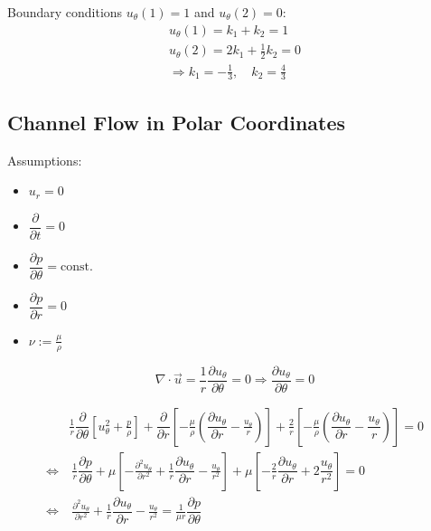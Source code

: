 \documentclass{article}
\numberwithin{equation}{section}
\newcommand{\pd}[2]{\dfrac{\partial #1}{\partial #2}}
\renewcommand{\div}{\nabla \cdot}
\begin{document}
Boundary conditions $u_\theta(1) = 1$ and $u_\theta(2) = 0$:
\begin{gather*}
    u_\theta(1) = k_1 + k_2 = 1 \\
    u_\theta(2) = 2 k_1 + \frac12 k_2 = 0 \\
    \Rightarrow k_1 = -\frac13, \quad k_2 = \frac43
\end{gather*}

\subsection{Channel Flow in Polar Coordinates}

Assumptions:
\begin{itemize}
    \item $u_r = 0$
    \item $\pd{}{t} = 0$
    \item $\pd{p}{\theta} = \text{const.}$
    \item $\pd{p}{r} = 0$
    \item $\nu := \frac{\mu}{\rho}$
\end{itemize}

\begin{equation}
    \div \vec{u} = \frac1r \pd{u_\theta}{\theta} = 0 \Rightarrow \pd{u_\theta}{\theta} = 0
\end{equation}

\begin{equation}
    \begin{aligned}
        &\frac1r \pd{}{\theta} \left[
            u_\theta^2 +
            \frac{p}{\rho}
        \right] +
        \pd{}{r} \left[
            -\frac{\mu}{\rho} \left(
                \pd{u_\theta}{r} - \frac{u_\theta}{r}
            \right)
        \right] +
        \frac2r \left[
            -\frac{\mu}{\rho}\left(\pd{u_\theta}{r} - \dfrac{u_\theta}{r}\right)
        \right] = 0\\
        \Leftrightarrow&\
        \frac{1}{r} \pd{p}{\theta} +
        \mu \left[
            -\frac{\partial^2 u_\theta}{\partial r^2}
            + \frac1r \pd{u_\theta}{r}
            - \frac{u_\theta}{r^2}
        \right] +
        \mu
        \left[
            - \frac2r \pd{u_\theta}{r}
            + 2 \dfrac{u_\theta}{r^2}
        \right] = 0\\
        \Leftrightarrow&\ 
        \frac{\partial^2 u_\theta}{\partial r^2}
        + \frac1r \pd{u_\theta}{r}
        - \frac{u_\theta}{r^2}
        = \frac{1}{\mu r} \pd{p}{\theta}
    \end{aligned}
\end{equation}
\end{document}
